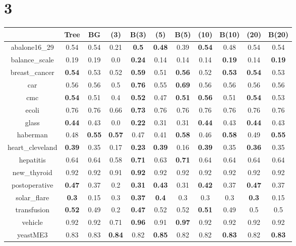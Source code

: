 \documentclass{article}%
\begin{document}
\section*{3}%
\begin{tabular}{c|cccccccccc}%
\hline%
&Tree&BG&(3)&B(3)&(5)&B(5)&(10)&B(10)&(20)&B(20)\\%
\hline%
abalone16\_29&0.54&0.54&0.21&\textbf{0.5}&\textbf{0.48}&0.39&\textbf{0.54}&0.48&0.54&0.54\\%
\hline%
balance\_scale&0.19&0.19&0.0&\textbf{0.24}&0.14&0.14&0.14&\textbf{0.19}&0.14&\textbf{0.19}\\%
\hline%
breast\_cancer&\textbf{0.54}&0.53&0.52&\textbf{0.59}&0.51&\textbf{0.56}&0.52&\textbf{0.53}&\textbf{0.54}&0.53\\%
\hline%
car&0.56&0.56&0.5&\textbf{0.76}&0.55&\textbf{0.69}&0.56&0.56&0.56&0.56\\%
\hline%
cmc&\textbf{0.54}&0.51&0.4&\textbf{0.52}&0.47&\textbf{0.51}&\textbf{0.56}&0.51&\textbf{0.54}&0.53\\%
\hline%
ecoli&0.76&0.76&0.66&\textbf{0.73}&0.76&0.76&0.76&0.76&0.76&0.76\\%
\hline%
glass&\textbf{0.44}&0.43&0.0&\textbf{0.22}&0.31&0.31&\textbf{0.44}&0.43&\textbf{0.44}&0.43\\%
\hline%
haberman&0.48&\textbf{0.55}&\textbf{0.57}&0.47&0.41&\textbf{0.58}&0.46&\textbf{0.58}&0.49&\textbf{0.55}\\%
\hline%
heart\_cleveland&\textbf{0.39}&0.35&0.17&\textbf{0.23}&\textbf{0.39}&0.16&\textbf{0.39}&0.35&\textbf{0.36}&0.35\\%
\hline%
hepatitis&0.64&0.64&0.58&\textbf{0.71}&0.63&\textbf{0.71}&0.64&0.64&0.64&0.64\\%
\hline%
new\_thyroid&0.92&0.92&0.91&\textbf{0.92}&0.92&0.92&0.92&0.92&0.92&0.92\\%
\hline%
postoperative&\textbf{0.47}&0.37&0.2&\textbf{0.31}&\textbf{0.43}&0.31&\textbf{0.42}&0.37&\textbf{0.47}&0.37\\%
\hline%
solar\_flare&\textbf{0.3}&0.15&0.3&\textbf{0.37}&\textbf{0.4}&0.3&0.3&0.3&\textbf{0.3}&0.15\\%
\hline%
transfusion&\textbf{0.52}&0.49&0.2&\textbf{0.47}&0.52&0.52&\textbf{0.51}&0.49&0.5&0.5\\%
\hline%
vehicle&0.92&0.92&0.71&\textbf{0.96}&0.91&\textbf{0.97}&0.92&0.92&0.92&0.92\\%
\hline%
yeastME3&0.83&0.83&\textbf{0.84}&0.82&\textbf{0.85}&0.82&0.82&\textbf{0.83}&0.82&\textbf{0.83}\\%

\end{tabular}
\end{document}
